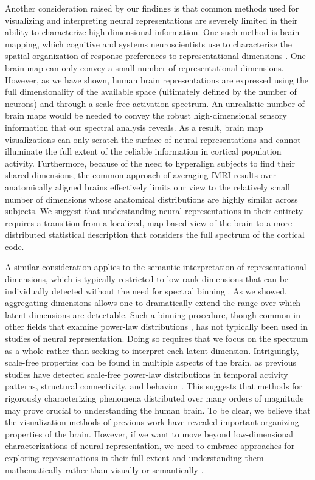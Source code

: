 \documentclass[10pt]{article}
\begin{document}
Another consideration raised by our findings is that common methods used for visualizing and interpreting neural representations are severely limited in their ability to characterize high-dimensional information. One such method is brain mapping, which cognitive and systems neuroscientists use to characterize the spatial organization of response preferences to representational dimensions \autocite{Huth2012,Bao2020,Tarhan2020,Hebart2023,Contier2024}. One brain map can only convey a small number of representational dimensions. However, as we have shown, human brain representations are expressed using the full dimensionality of the available space (ultimately defined by the number of neurons) and through a scale-free activation spectrum. An unrealistic number of brain maps would be needed to convey the robust high-dimensional sensory information that our spectral analysis reveals. As a result, brain map visualizations can only scratch the surface of neural representations and cannot illuminate the full extent of the reliable information in cortical population activity. Furthermore, because of the need to hyperalign subjects to find their shared dimensions, the common approach of averaging fMRI results over anatomically aligned brains effectively limits our view to the relatively small number of dimensions whose anatomical distributions are highly similar across subjects. We suggest that understanding neural representations in their entirety requires a transition from a localized, map-based view of the brain to a more distributed statistical description that considers the full spectrum of the cortical code.

A similar consideration applies to the semantic interpretation of representational dimensions, which is typically restricted to low-rank dimensions that can be individually detected without the need for spectral binning \autocite{Huth2012,Khosla2022,Tarhan2020,Hebart2023}. As we showed, aggregating dimensions allows one to dramatically extend the range over which latent dimensions are detectable. Such a binning procedure, though common in other fields that examine power-law distributions \autocite{Lin2023}, has not typically been used in studies of neural representation. Doing so requires that we focus on the spectrum as a whole rather than seeking to interpret each latent dimension. Intriguingly, scale-free properties can be found in multiple aspects of the brain, as previous studies have detected scale-free power-law distributions in temporal activity patterns, structural connectivity, and behavior \autocite{He2014,Lynn2024,Kello2010}. This suggests that methods for rigorously characterizing phenomena distributed over many orders of magnitude may prove crucial to understanding the human brain. To be clear, we believe that the visualization methods of previous work have revealed important organizing properties of the brain. However, if we want to move beyond low-dimensional characterizations of neural representation, we need to embrace approaches for exploring representations in their full extent and understanding them mathematically rather than visually or semantically \autocite{Roads2024}.
\end{document}
